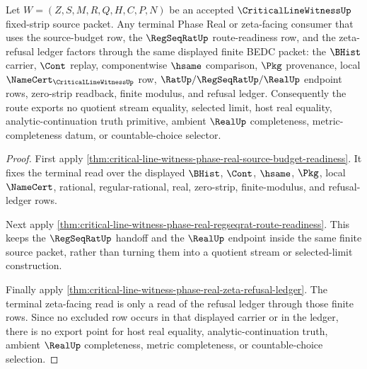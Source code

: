 \begin{theorem}
\label{thm:critical-line-witness-phase-real-terminal-nocompleteness-boundary}
Let $W=(Z,S,M,R,Q,H,C,P,N)$ be an accepted $\CriticalLineWitnessUp$ fixed-strip source packet. Any terminal Phase Real or zeta-facing consumer that uses the source-budget row, the $\RegSeqRatUp$ route-readiness row, and the zeta-refusal ledger factors through the same displayed finite BEDC packet: the $\BHist$ carrier, $\Cont$ replay, componentwise $\hsame$ comparison, $\Pkg$ provenance, local $\NameCert_{\CriticalLineWitnessUp}$ row, $\RatUp/\RegSeqRatUp/\RealUp$ endpoint rows, zero-strip readback, finite modulus, and refusal ledger. Consequently the route exports no quotient stream equality, selected limit, host real equality, analytic-continuation truth primitive, ambient $\RealUp$ completeness, metric-completeness datum, or countable-choice selector.
\end{theorem}
\begin{proof}
First apply \autoref{thm:critical-line-witness-phase-real-source-budget-readiness}. It fixes the terminal read over the displayed $\BHist$, $\Cont$, $\hsame$, $\Pkg$, local $\NameCert$, rational, regular-rational, real, zero-strip, finite-modulus, and refusal-ledger rows.

Next apply \autoref{thm:critical-line-witness-phase-real-regseqrat-route-readiness}. This keeps the $\RegSeqRatUp$ handoff and the $\RealUp$ endpoint inside the same finite source packet, rather than turning them into a quotient stream or selected-limit construction.

Finally apply \autoref{thm:critical-line-witness-phase-real-zeta-refusal-ledger}. The terminal zeta-facing read is only a read of the refusal ledger through those finite rows. Since no excluded row occurs in that displayed carrier or in the ledger, there is no export point for host real equality, analytic-continuation truth, ambient $\RealUp$ completeness, metric completeness, or countable-choice selection.
\end{proof}
